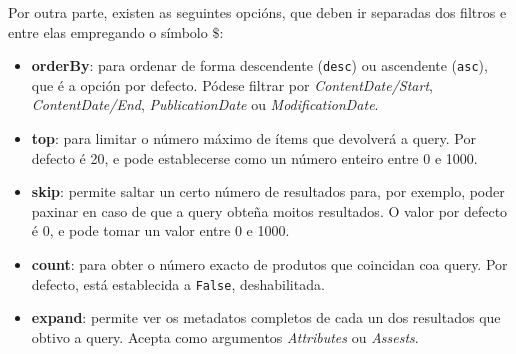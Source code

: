 Por outra parte, existen as seguintes opcións, que deben ir separadas dos filtros e entre elas empregando o símbolo $\$$:
\begin{itemize}
    \item \textbf{orderBy}: para ordenar de forma descendente (\texttt{desc}) ou ascendente (\texttt{asc}), que é a opción por defecto. Pódese filtrar por \textit{ContentDate/Start}, \textit{ContentDate/End},
    \textit{PublicationDate} ou \textit{ModificationDate}.
    \item \textbf{top}: para limitar o número máximo de ítems que devolverá a query. Por defecto é 20, e pode establecerse como un número enteiro entre 0 e 1000.
    \item \textbf{skip}: permite saltar un certo número de resultados para, por exemplo, poder paxinar en caso de que a query obteña moitos resultados. O valor por defecto é 0, e pode tomar un
    valor entre 0 e 1000.
    \item \textbf{count}: para obter o número exacto de produtos que coincidan coa query. Por defecto, está establecida a \texttt{False}, deshabilitada.
    \item \textbf{expand}: permite ver os metadatos completos de cada un dos resultados que obtivo a query. Acepta como argumentos \textit{Attributes} ou \textit{Assests}.
\end{itemize}

